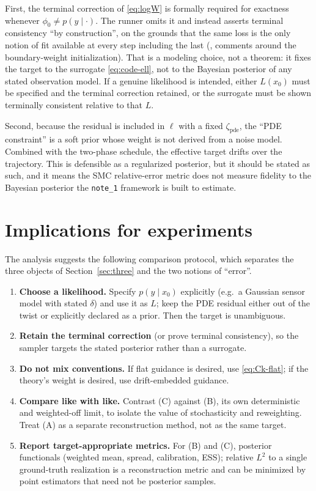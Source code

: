 \documentclass[11pt]{article}
\begin{document}
First, the terminal correction of \eqref{eq:logW} is formally required for exactness whenever
$\phi_0\neq p(y\mid\cdot)$. The runner omits it and instead asserts terminal consistency ``by
construction'', on the grounds that the same loss is the only notion of fit available at every step
including the last (, comments around the boundary-weight
initialization). That is a modeling choice, not a theorem: it fixes the target to the surrogate
\eqref{eq:code-ell}, not to the Bayesian posterior of any stated observation model. If a genuine
likelihood is intended, either $L(x_0)$ must be specified and the terminal correction retained, or
the surrogate must be shown terminally consistent relative to that $L$.

Second, because the residual is included in $\ell$ with a fixed $\zeta_{\mathrm{pde}}$, the ``PDE
constraint'' is a soft prior whose weight is not derived from a noise model. Combined with the
two-phase schedule, the effective target drifts over the trajectory. This is defensible as a
regularized posterior, but it should be stated as such, and it means the SMC relative-error metric
does not measure fidelity to the Bayesian posterior the \texttt{note\_1} framework is built to estimate.

\section{Implications for experiments}\label{sec:implications}

The analysis suggests the following comparison protocol, which separates the three objects of
Section~\ref{sec:three} and the two notions of ``error''.

\begin{enumerate}
  \item \textbf{Choose a likelihood.} Specify $p(y\mid x_0)$ explicitly (e.g.\ a Gaussian sensor
        model with stated $\delta$) and use it as $L$; keep the PDE residual either out of the twist
        or explicitly declared as a prior. Then the target is unambiguous.
  \item \textbf{Retain the terminal correction} (or prove terminal consistency), so the sampler
        targets the stated posterior rather than a surrogate.
  \item \textbf{Do not mix conventions.} If flat guidance is desired, use
        \eqref{eq:Ck-flat}; if the theory's weight is desired, use drift-embedded guidance.
  \item \textbf{Compare like with like.} Contrast (C) against (B), its own deterministic and
        weighted-off limit, to isolate the value of stochasticity and reweighting. Treat (A) as a
        separate reconstruction method, not as the same target.
  \item \textbf{Report target-appropriate metrics.} For (B) and (C), posterior functionals
        (weighted mean, spread, calibration, ESS); relative $L^2$ to a single ground-truth
        realization is a reconstruction metric and can be minimized by point estimators that need
        not be posterior samples.
\end{enumerate}
\end{document}
